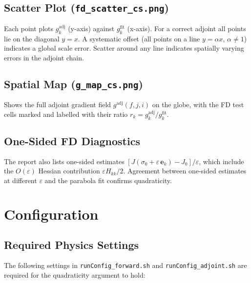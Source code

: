 \documentclass[12pt]{article}
\newcommand{\gadj}{g^{\mathrm{adj}}}
\newcommand{\gfit}{g^{\mathrm{fit}}}
\newcommand{\ek}{\mathbf{e}_k}
\newcommand{\eps}{\varepsilon}
\begin{document}
\subsection{Scatter Plot (\texttt{fd\_scatter\_cs.png})}

Each point plots $\gadj_k$ (y-axis) against $\gfit_k$ (x-axis).  For a
correct adjoint all points lie on the diagonal $y = x$.  A systematic offset
(all points on a line $y = \alpha x$, $\alpha \neq 1$) indicates a global
scale error.  Scatter around any line indicates spatially varying errors in the
adjoint chain.

\subsection{Spatial Map (\texttt{g\_map\_cs.png})}

Shows the full adjoint gradient field $\gadj(f,j,i)$ on the globe, with the
FD test cells marked and labelled with their ratio $r_k = \gadj_k/\gfit_k$.

\subsection{One-Sided FD Diagnostics}

The report also lists one-sided estimates
$[J(\sigma_0 + \eps\,\ek) - J_0] / \eps$, which include the $O(\eps)$ Hessian
contribution $\eps H_{kk}/2$.  Agreement between one-sided estimates at
different $\eps$ and the parabola fit confirms quadraticity.

\section{Configuration}

\subsection{Required Physics Settings}

The following settings in \texttt{runConfig\_forward.sh} and
\texttt{runConfig\_adjoint.sh} are required for the quadraticity argument to
hold:
\end{document}
